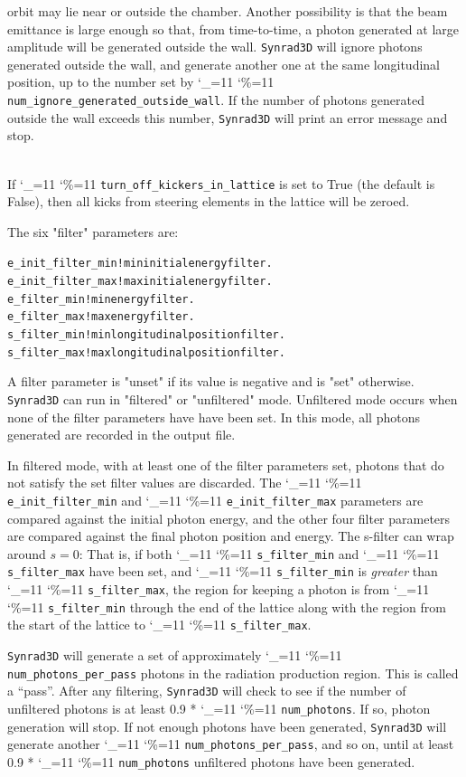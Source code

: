 \documentclass[11pt,openany]{report}
\newcommand{\srthree}{\texttt{Synrad3D}\xspace}
\newcommand\ttcmd{\begingroup\catcode`\_=11 \catcode`\%=11 \dottcmd}
\newcommand\dottcmd[1]{\texttt{#1}\endgroup}
\newcommand{\vn}{\ttcmd}
\newcommand{\Newline}{\hfil \\}
\newlength{\ExBeg}
\newlength{\ExEnd}
\newenvironment{example}
  {\vspace{\ExBeg} \begin{alltt}}
  {\end{alltt} \vspace{\ExEnd}}
\begin{document}
\begin{description}
orbit may lie near or outside the chamber. Another possibility is that
the beam emittance is large enough so that, from time-to-time, a
photon generated at large amplitude will be generated outside the
wall. \srthree will ignore photons generated outside the wall, and
generate another one at the same longitudinal position, up to the
number set by \vn{num_ignore_generated_outside_wall}. If the number of
photons generated outside the wall exceeds this number, \srthree will
print an error message and stop.
  \item[\vn{turn_off_kickers_in_lattice}] \Newline
If \vn{turn_off_kickers_in_lattice} is set to True (the default is
False), then all kicks from steering elements in the lattice will be zeroed.

\end{description}

The six "filter" parameters are:
\begin{example}
  e_init_filter_min   ! min initial energy filter.
  e_init_filter_max   ! max initial energy filter.
  e_filter_min        ! min energy filter.
  e_filter_max        ! max energy filter.
  s_filter_min        ! min longitudinal position filter.
  s_filter_max        ! max longitudinal position filter.
\end{example}
A filter parameter is "unset" if its value is negative and is "set"
otherwise.  \srthree can run in "filtered" or "unfiltered"
mode. Unfiltered mode occurs when none of the filter parameters have
have been set. In this mode, all photons generated are recorded in
the output file.

In filtered mode, with at least one of the filter parameters set,
photons that do not satisfy the set filter values are discarded. The
\vn{e_init_filter_min} and \vn{e_init_filter_max} parameters are 
compared against the initial photon energy, and the other four
filter parameters are compared against the final photon position and
energy. The s-filter can wrap around $s = 0$: That is,
if both \vn{s_filter_min} and \vn{s_filter_max} have been set,
and \vn{s_filter_min} is {\em greater} than \vn{s_filter_max}, the region
for keeping a photon is from \vn{s_filter_min} through the end of the
lattice along with the region from the start of the lattice to
\vn{s_filter_max}.

\srthree will generate a set of approximately
\vn{num_photons_per_pass} photons in the radiation production region.
This is called a ``pass''.  After any filtering, \srthree will check
to see if the number of unfiltered photons is at least 0.9 *
\vn{num_photons}. If so, photon generation will stop. If not enough
photons have been generated, \srthree will generate another
\vn{num_photons_per_pass}, and so on, until at least 0.9 *
\vn{num_photons} unfiltered photons have been generated.
\end{document}
